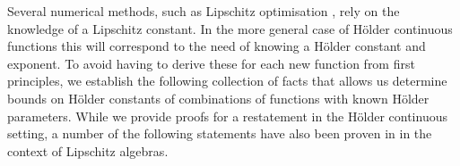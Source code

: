 
Several numerical methods, such as Lipschitz optimisation \cite{Shubert:72}, rely on the knowledge of a Lipschitz constant. In the more general case of H\"older continuous functions this will correspond to the need of knowing a H\"older constant and exponent. To avoid having to derive these for each new function from first principles, we establish the following collection of facts that allows us determine bounds on H\"older constants of combinations of functions with known H\"older parameters.
While we provide proofs for a restatement in the H\"older continuous setting, a number of the following statements have also been proven in \cite{Weaver1999} in the context of Lipschitz algebras.





